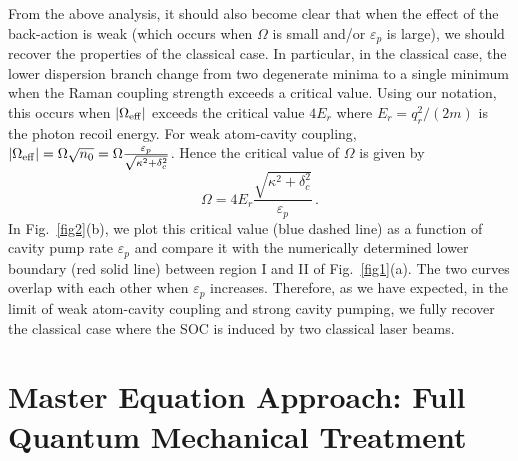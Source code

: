 \documentclass[atoms,article,submit,moreauthors,dvi2pdf,12pt,a4paper]{mdpi}
\begin{document}
From the above analysis, it should also become clear that when the effect of the back-action is weak (which occurs when $\Omega$ is small and/or $\varepsilon_p$ is large), we should recover the properties of the classical case. In particular, in the classical case, the lower dispersion branch change from two degenerate minima to a single minimum when the Raman coupling strength exceeds a critical value. Using our notation, this occurs when $|\Omega_{\rm eff}|$ exceeds the critical value $4E_r$ where $E_r=q_r^2/(2m)$ is the photon recoil energy. For weak atom-cavity coupling, $|\Omega_{\rm eff}| = \Omega \sqrt{n_0}={\Omega} \frac{\varepsilon_p}{\sqrt{\kappa^2+ \delta_c^2}}$. Hence the critical value of $\Omega$ is given by
\begin{equation}
\Omega=4E_r\frac{\sqrt{\kappa^2+\delta_c^2}}{\varepsilon_p}\,.
\label{ome}
\end{equation}
In Fig.~\ref{fig2}(b), we plot this critical value (blue dashed line) as a function of cavity pump rate $\varepsilon_p$ and compare it with the numerically determined lower boundary (red solid line) between region I and II of Fig.~\ref{fig1}(a). The two curves overlap with each other when $\varepsilon_p$ increases. Therefore, as we have expected, in the limit of weak atom-cavity coupling and strong cavity pumping, we fully recover the classical case where the SOC is induced by two classical laser beams.


\section{Master Equation Approach: Full Quantum Mechanical Treatment } \label{master}
\end{document}
